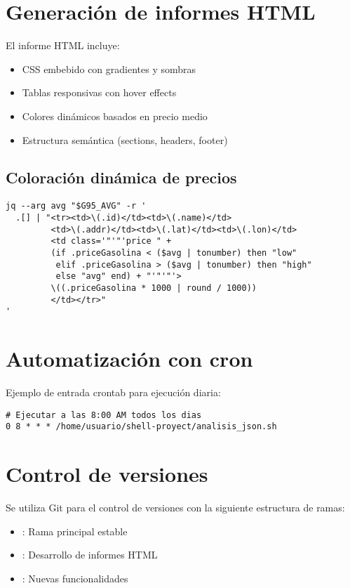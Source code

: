 \section{Generación de informes HTML}

El informe HTML incluye:

\begin{itemize}
  \item CSS embebido con gradientes y sombras
  \item Tablas responsivas con hover effects
  \item Colores dinámicos basados en precio medio
  \item Estructura semántica (sections, headers, footer)
\end{itemize}

\subsection{Coloración dinámica de precios}

\begin{lstlisting}[style=bash,caption={Asignación de clases CSS}]
jq --arg avg "$G95_AVG" -r '
  .[] | "<tr><td>\(.id)</td><td>\(.name)</td>
         <td>\(.addr)</td><td>\(.lat)</td><td>\(.lon)</td>
         <td class='"'"'price " + 
         (if .priceGasolina < ($avg | tonumber) then "low" 
          elif .priceGasolina > ($avg | tonumber) then "high" 
          else "avg" end) + "'"'"'>
         \((.priceGasolina * 1000 | round / 1000))
         </td></tr>"
'
\end{lstlisting}

\section{Automatización con cron}

Ejemplo de entrada crontab para ejecución diaria:

\begin{lstlisting}[style=bash]
# Ejecutar a las 8:00 AM todos los dias
0 8 * * * /home/usuario/shell-proyect/analisis_json.sh
\end{lstlisting}

\section{Control de versiones}

Se utiliza Git para el control de versiones con la siguiente estructura de ramas:

\begin{itemize}
  \item {}: Rama principal estable
  \item {}: Desarrollo de informes HTML
  \item {}: Nuevas funcionalidades
\end{itemize}
